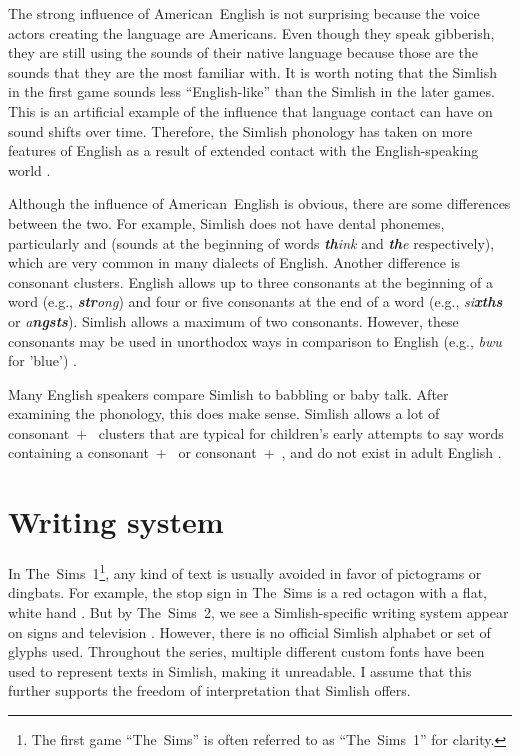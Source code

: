 \documentclass[11pt]{article}
\begin{document}
The strong influence of American~English is not surprising because the voice actors creating the language are Americans.
Even though they speak gibberish, they are still using the sounds of their native language because those are the sounds that they are the most familiar with. 
It is worth noting that the Simlish in the first game sounds less ``English-like'' than the Simlish in the later games. This is an artificial example of the influence that language contact can have on sound shifts over time. Therefore, the Simlish phonology has taken on more features of English as a result of extended contact with the English-speaking world \cite{ejm2020phonology}.

Although the influence of American~English is obvious, there are some differences between the two. For example, Simlish does not have dental phonemes, particularly  %
and  %
(sounds at the beginning of words \textit{\textbf{th}ink} and \textit{\textbf{th}e} respectively), which are very common in many dialects of English. Another difference is consonant clusters. English allows up to three consonants at the beginning of a word (e.g., \textit{\textbf{str}ong}) and four or five consonants at the end of a word (e.g., \textit{si\textbf{xths}} or \textit{a\textbf{ngsts}}). Simlish allows a maximum of two consonants. However, these consonants may be used in unorthodox ways in comparison to English (e.g., \textit{bwu} for 'blue') \cite{ejm2020phonology}.

Many English speakers compare Simlish to babbling or baby talk. After examining the phonology, this does make sense. Simlish allows a lot of consonant~+~ %
clusters that are typical for children's early attempts to say words containing a consonant~+~ %
or consonant~+~, %
and do not exist in adult English \cite{ejm2020phonology}.

\section*{Writing system}

In The~Sims~1\footnote{The first game ``The~Sims'' is often referred to as ``The~Sims~1'' for clarity.}, any kind of text is usually avoided in favor of pictograms or dingbats. For example, the stop sign in The~Sims is a red octagon with a flat, white hand \cite{atwood2007software}. But by The~Sims~2, we see a Simlish-specific writing system appear on signs and television \cite{kirce2024language}. However, there is no official Simlish alphabet or set of glyphs used. Throughout the series, multiple different custom fonts have been used to represent texts in Simlish, making it unreadable. I assume that this further supports the freedom of interpretation that Simlish offers.
\end{document}
